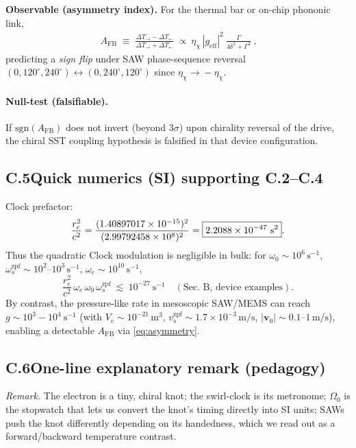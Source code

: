 \documentclass[aps,prb,preprint,amsmath,amssymb]{revtex4-2} %
\newcommand{\rcVal}{1.40897017\times10^{-15}} %
\newcommand{\rc}{r_c}
\begin{document}
        \textbf{Observable (asymmetry index).}
        For the thermal bar or on-chip phononic link,
        \begin{align}
            \boxed{\ A_\textrm{FB}\;\equiv\;\frac{\Delta T_{\rightarrow}-\Delta T_{\leftarrow}}{\Delta T_{\rightarrow}+\Delta T_{\leftarrow}}
            \ \propto\ \eta_\chi\,|g_\textrm{eff}|^{2}\ \frac{\Gamma}{4\delta^{2}+\Gamma^{2}}\ }\!,
            \label{eq:asymmetry}
        \end{align}
        predicting a \emph{sign flip} under SAW phase-sequence reversal \((0,120^\circ,240^\circ)\!\leftrightarrow\!(0,240^\circ,120^\circ)\) since \(\eta_\chi\!\to\!-\eta_\chi\).

        \paragraph*{Null-test (falsifiable).}
            If \(\mathrm{sgn}(A_\textrm{FB})\) does not invert (beyond \(3\sigma\)) upon chirality reversal of the drive, the chiral SST coupling hypothesis is falsified in that device configuration.

        \subsection*{C.5\quad Quick numerics (SI) supporting C.2–C.4}
        \noindent Clock prefactor:
        \[
            \frac{\rc^{2}}{c^{2}}=\frac{(\rcVal)^2}{(\cVal)^2}=\boxed{2.2088\times 10^{-47}\ \mathrm{s^{2}}}.
        \]
        Thus the quadratic Clock modulation is negligible in bulk: for \(\omega_0\!\sim\!10^{6}\,\mathrm{s^{-1}}\), \(\omega_s^\textrm{zpf}\!\sim\!10^{2}\text{–}10^{3}\,\mathrm{s^{-1}}\), \(\omega_e\!\sim\!10^{10}\,\mathrm{s^{-1}}\),
        \[
            \frac{\rc^2}{c^2}\,\omega_e\,\omega_0\,\omega_s^\textrm{zpf}\ \lesssim\ 10^{-27}\ \mathrm{s^{-1}} \quad(\text{Sec.\ B, device examples}).
        \]
        By contrast, the pressure-like rate in mesoscopic SAW/MEMS can reach \(g\sim 10^{3}\!-\!10^{4}\ \mathrm{s^{-1}}\) (with \(V_e\!\sim\!10^{-21}\,\mathrm{m^{3}}\), \(v_s^\textrm{zpf}\!\sim\!1.7\times10^{-3}\,\mathrm{m/s}\), \(|\mathbf v_0|\!\sim\!0.1\text{–}1\,\mathrm{m/s}\)), enabling a detectable \(A_\textrm{FB}\) via \eqref{eq:asymmetry}.

        \subsection*{C.6\quad One-line explanatory remark (pedagogy)}
        \emph{Remark.} The electron is a tiny, chiral knot; the swirl-clock is its metronome; \(\Omega_{0}\) is the stopwatch that lets us convert the knot’s timing directly into SI units; SAWs push the knot differently depending on its handedness, which we read out as a forward/backward temperature contrast.
\end{document}
